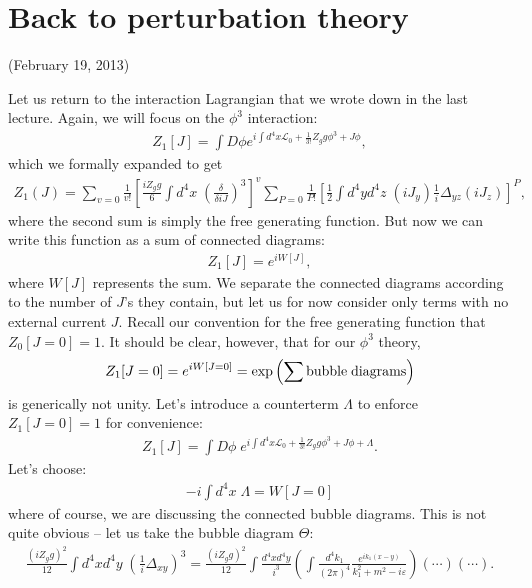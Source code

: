 \documentclass{../mathnotes}
\begin{document}
\section*{Back to perturbation theory}

(February 19, 2013)

Let us return to the interaction Lagrangian that we wrote down in the last lecture. Again, we will focus on the $\phi^3$ interaction:
\begin{align*}
    Z_1[J]=\int D\phi e^{i\int d^4x \mathcal{L}_0+\frac{1}{3!}Z_g g\phi^3+J\phi},
\end{align*}
which we formally expanded to get
 \begin{align*}
    Z_1(J)=\sum_{v=0}\frac{1}{v!}\left[ \frac{iZ_gg}{6}\int d^4x\;\left( \frac{\delta}{\delta iJ} \right)^3 \right]^v\sum_{P=0}\frac{1}{P!}\left[ \frac{1}{2}\int d^4y d^4z\; (iJ_y)\frac{1}{i}\Delta_{yz}(iJ_z)\right]^P,
\end{align*}
where the second sum is simply the free generating function. But now we can write this function as a sum of connected diagrams:
\begin{align*}
    Z_1[J]=e^{iW[J]},
\end{align*}
where $W[J]$ represents the sum. We separate the connected diagrams according to the number of $J$'s they contain, but let us for now
consider only terms with no external current $J$. Recall our convention for the free generating function that $Z_0[J=0]=1$. It should be
clear, however, that for our $\phi^3$ theory,
\begin{align*}
    Z_1[J=0]=e^{iW[J=0]}=\exp\left( \sum\rm{bubble\; diagrams} \right)
\end{align*}
is generically not unity. Let's introduce a counterterm $\Lambda$ to enforce $Z_1[J=0]=1$ for convenience:
\begin{align*}
    Z_1[J]=\int D\phi\; e^{i\int d^4x \mathcal{L}_0+\frac{1}{3!}Z_g g\phi^3+J\phi+\Lambda}.
\end{align*}
Let's choose:
\begin{align*}
    -i\int d^4x\;\Lambda=W[J=0]
\end{align*}
where of course, we are discussing the connected bubble diagrams. This is not quite obvious -- let us take the bubble diagram $\Theta$:
\begin{align*}
    \frac{(iZ_gg)^2}{12}\int d^4xd^4y\;(\frac{1}{i}\Delta_{xy})^3=\frac{(iZ_gg)^2}{12}\int\frac{d^4x d^4y}{i^3}\left( \int \frac{d^4k_1}{(2\pi)^4}\frac{e^{ik_1(x-y)}}{k_1^2+m^2-i\varepsilon} \right)\left( \cdots \right)\left( \cdots \right).
\end{align*}
\end{document}
